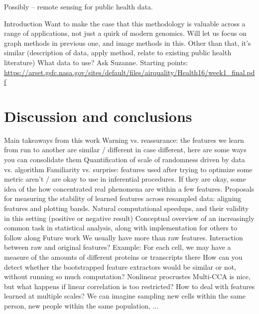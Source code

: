 \documentclass[11pt]{article}
\begin{document}
Possibly -- remote sensing for public health data.

\begin{outline}
  \1 Introduction
    \2 Want to make the case that this methodology is valuable across a range of
    applications, not just a quirk of modern genomics.
    \2 Will let us focus on graph methods in previous one, and image methods in
    this.
    \2 Other than that, it's similar (description of data, apply method, relate
    to existing public health literature)
    \2 What data to use? Ask Suzanne.
      \3 Starting points: \url{https://arset.gsfc.nasa.gov/sites/default/files/airquality/Health16/week1_final.pdf}
\end{outline}

\section{Discussion and conclusions}

\begin{outline}
  \1 Main takeaways from this work
    \2 Warning vs. reassurance: the features we learn from run to another are
    similar / different
      \3 in case different, here are some ways you can consolidate them
      \3 Quantification of scale of randomness driven by data vs. algorithm
    \2 Familiarity vs. surprise: features used after trying to optimize some
    metric aren't / are okay to use in inferential procedures. If they are okay,
    some idea of the how concentrated real phenomena are within a few features.
    \2 Proposals for measuring the stability of learned features across
    resampled data: aligning features and plotting bands.
    \2 Natural computational speedups, and their validity in this setting
    (positive or negative result)
    \2 Conceptual overview of an increasingly common task in statistical
    analysis, along with implementation for others to follow along
  \1 Future work
    \2 We usually have more than raw features. Interaction between raw and
    original features?
      \3 Example: For each cell, we may have a measure of the amounts of
      different proteins or transcripts there
    \2 How can you detect whether the bootstrapped feature extractors would be
    similar or not, without running so much computation?
    \2 Nonlinear procrustes
      \3 Multi-CCA is nice, but what happens if linear correlation is too
      restricted?
    \2 How to deal with features learned at multiple scales? We can imagine
    sampling new cells within the same person, new people within the same
    population, ...
\end{outline}



\end{document}

